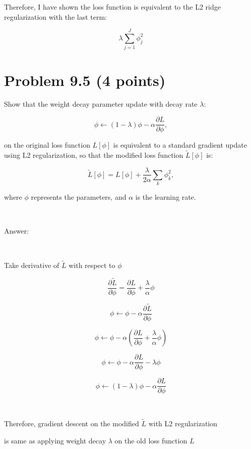 \documentclass[10pt]{article}
\begin{document}
\noindent Therefore, I have shown the loss function is equivalent to the L2 ridge regularization with the last term: 

$$ \lambda  \sum_{j=1}^{J} \phi_j^2 $$ 



\newpage


\section*{Problem 9.5 (4 points)}

Show that the weight decay parameter update with decay rate $\lambda$:

\begin{equation}
    \phi \leftarrow (1 - \lambda) \phi - \alpha \frac{\partial L}{\partial \phi},
\end{equation}

\noindent on the original loss function $L[\phi]$ is equivalent to a standard
gradient update using L2 regularization, so that the modified loss function
$\tilde{L}[\phi]$ is:

\begin{equation}
    \tilde{L}[\phi] = L[\phi] + \frac{\lambda}{2\alpha} \sum_{k} \phi_k^2,
\end{equation}

\noindent  where $\phi$ represents the parameters, and $\alpha$ is the learning rate.

\ 

\noindent Answer:

\

\noindent Take derivative of $\tilde{L}$ with respect to $\phi$


\begin{equation}
	\frac{\partial \tilde{L} }{\partial \phi} = \frac{\partial L}{\partial \phi} + \frac{\lambda}{\alpha} \phi
\end{equation}


\begin{equation}
    \phi \leftarrow  \phi - \alpha \frac{\partial \tilde{L}}{\partial \phi}
\end{equation}


\begin{equation}
    \phi \leftarrow  \phi - \alpha ( \frac{\partial L}{\partial \phi} + \frac{\lambda}{\alpha} \phi )
\end{equation}


\begin{equation}
    \phi \leftarrow  \phi - \alpha  \frac{\partial L}{\partial \phi} - \lambda \phi 
\end{equation}


\begin{equation}
    \phi \leftarrow  (1 - \lambda) \phi - \alpha  \frac{\partial L}{\partial \phi} 
\end{equation}

\

\noindent Therefore, gradient descent on the modified $\tilde{L}$ with L2 regularization

\noindent is same as applying weight decay $\lambda$ on the old loss function $L$
\end{document}
